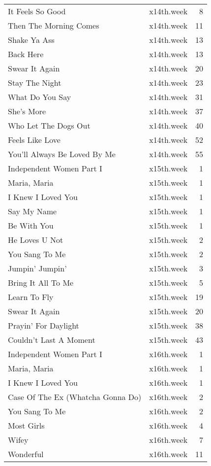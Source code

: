 \begin{table}[ht]
\begin{tabular}{llr}
  It Feels So Good & x14th.week &   8 \\ 
  Then The Morning Comes & x14th.week &  11 \\ 
  Shake Ya Ass & x14th.week &  13 \\ 
  Back Here & x14th.week &  13 \\ 
  Swear It Again & x14th.week &  20 \\ 
  Stay The Night & x14th.week &  23 \\ 
  What Do You Say & x14th.week &  31 \\ 
  She's More & x14th.week &  37 \\ 
  Who Let The Dogs Out & x14th.week &  40 \\ 
  Feels Like Love & x14th.week &  52 \\ 
  You'll Always Be Loved By Me & x14th.week &  55 \\ 
  Independent Women Part I & x15th.week &   1 \\ 
  Maria, Maria & x15th.week &   1 \\ 
  I Knew I Loved You & x15th.week &   1 \\ 
  Say My Name & x15th.week &   1 \\ 
  Be With You & x15th.week &   1 \\ 
  He Loves U Not & x15th.week &   2 \\ 
  You Sang To Me & x15th.week &   2 \\ 
  Jumpin' Jumpin' & x15th.week &   3 \\ 
  Bring It All To Me & x15th.week &   5 \\ 
  Learn To Fly & x15th.week &  19 \\ 
  Swear It Again & x15th.week &  20 \\ 
  Prayin' For Daylight & x15th.week &  38 \\ 
  Couldn't Last A Moment & x15th.week &  43 \\ 
  Independent Women Part I & x16th.week &   1 \\ 
  Maria, Maria & x16th.week &   1 \\ 
  I Knew I Loved You & x16th.week &   1 \\ 
  Case Of The Ex (Whatcha Gonna Do) & x16th.week &   2 \\ 
  You Sang To Me & x16th.week &   2 \\ 
  Most Girls & x16th.week &   4 \\ 
  Wifey & x16th.week &   7 \\ 
  Wonderful & x16th.week &  11 \\ 

\end{tabular}
\end{table}
